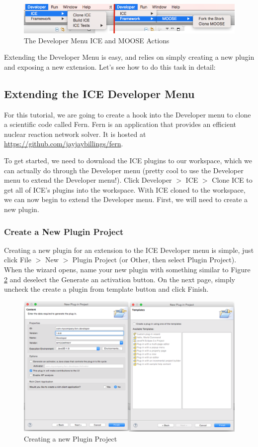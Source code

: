 \begin{figure}[h]
\includegraphics[width=\textwidth]{figures/menu.png}
\caption{The Developer Menu ICE and MOOSE Actions}
\label{fig:devcloneice}
\end{figure}

Extending the Developer Menu is easy, and relies on simply creating a new plugin
and exposing a new extension. Let's see how to do this task in detail:

\subsection*{Extending the ICE Developer Menu}
For this tutorial, we are going to create a hook into the Developer menu to
clone a scientific code called Fern. Fern is an application that provides an
efficient nuclear reaction network solver. It is hosted at
\url{https://github.com/jayjaybillings/fern}. 

To get started, we need to download the ICE plugins to our workspace, which we
can actually do through the Developer menu (pretty cool to use the Developer 
menu to extend the Developer menu!). Click Developer $>$ ICE $>$ Clone ICE to 
get all of ICE's plugins into the workspace. With ICE cloned to the workspace, 
we can now begin to extend the Developer menu. First, we will need to create a
new plugin. 

\subsubsection*{Create a New Plugin Project}
Creating a new plugin for an extension to the ICE Developer menu is simple, just
click File $>$ New $>$ Plugin Project (or Other, then select Plugin Project).
When the wizard opens, name your new plugin with something similar to Figure
\ref{fig:newplugin} and deselect the Generate an activation button. On the next
page, simply uncheck the create a plugin from template button and click Finish. 
\begin{figure}[h]
\includegraphics[width=\textwidth]{figures/combinedplugin.png}
\caption{Creating a new Plugin Project}
\label{fig:newplugin}
\end{figure}

